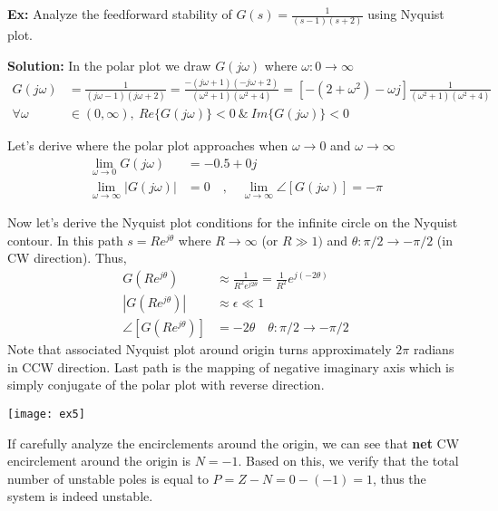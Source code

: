\documentclass[twoside]{article}
\begin{document}
\newpage

\textbf{Ex:} Analyze the feedforward stability of $G(s) =
\frac{1}{ (s-1)(s+ 2)}$ using Nyquist plot. 

\textbf{Solution:} In the polar plot we draw $G(j \omega)$ where $\omega : 0 \to \infty$
%
\begin{align*}
  G(j \omega) &= \frac{1}{ (j \omega - 1) (j \omega + 2) } = 
  \frac{-(j \omega + 1) (-j \omega + 2)}{ (\omega^2 + 1) (\omega^2 +
  4) } = \left[ -(2+\omega^2) - \omega j \right] \frac{1}{(\omega^2 + 1) (\omega^2 +
  4)}
\\
\forall \omega &\in (0 , \infty) , \ Re \lbrace G(j \omega)
  \rbrace < 0 \ \& \ Im \lbrace G(j \omega)
  \rbrace < 0
\end{align*}

Let's derive where the polar plot approaches when $\omega \to 0$
and $\omega \to \infty$
\begin{align*}
  \lim_{\omega \to 0} G(j \omega) &= -0.5 + 0 j
\\
  \lim_{\omega \to \infty} | G(j \omega) | &= 0
\quad , \quad
 \lim_{\omega \to \infty} \angle [ G(j \omega) ] = -\pi
\end{align*}

Now let's derive the Nyquist plot conditions for the infinite circle
on the Nyquist contour. In this path $s = R e^{j \theta}$ where $R \to
\infty$ (or $R \gg 1)$ and $\theta : \pi/2 \to - \pi/2$ (in CW
direction). Thus,
%
\begin{align*}
  G(R e^{j \theta}) &\approx \frac{1}{R^2 e^{j 2\theta}} =
  \frac{1}{R^2} e^{j (-2\theta)}
\\
  | G(R e^{j \theta}) | &\approx \epsilon \ll 1
\\
 \angle [ G(R e^{j \theta}) ] &= - 2 \theta \quad \theta : \pi/2 \to -\pi/2
\end{align*}
%
Note that associated Nyquist plot around origin turns approximately
$2 \pi$ radians in CCW direction. Last path is the mapping of negative imaginary axis which is simply
conjugate of the polar plot with reverse direction. 

\vspace{6 pt}

  \begin{minipage}[h]{1\linewidth}
    \begin{center}
      \texttt{[image: ex5]}
    \end{center}
  \end{minipage}

\vspace{6 pt}

If carefully analyze the encirclements around the origin, 
we can see that \textbf{net} CW encirclement around the origin is 
$N = - 1$. Based on this, we verify that   
the total number of unstable poles is equal to
$P = Z - N = 0 - (-1) = 1$, thus the system is indeed unstable. 


\end{document}
